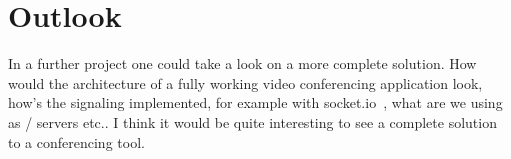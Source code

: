 \chapter{Outlook}
In a further project one could take a look on a more complete solution. How would the architecture of a fully working video conferencing application look, how's the signaling implemented, for example with socket.io~\autocite{socketio}, what are we using as / servers etc.. I think it would be quite interesting to see a complete solution to a conferencing tool.